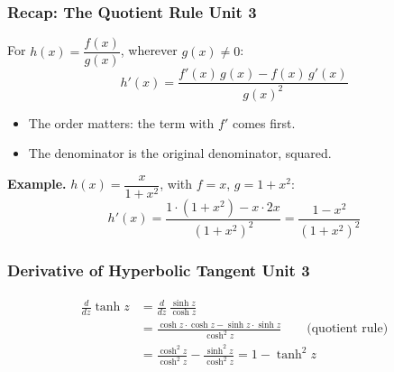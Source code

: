 \documentclass[12pt]{beamer}
\newcommand{\FrameTitle}[2]{\frametitle{#1 \hfill \small\textnormal{\textcolor{midgray}{#2}}}}
\begin{document}
\begin{frame}
    \medskip
    {}
\end{frame}

\begin{frame}\FrameTitle{Recap: The Quotient Rule}{Unit 3}
    For $h(x) = \dfrac{f(x)}{g(x)}$, wherever $g(x) \neq 0$:
    \[
        h'(x) = \frac{f'(x)\,g(x) - f(x)\,g'(x)}{g(x)^2}
    \]
    \begin{itemize}
        \item The order matters: the term with $f'$ comes first.
        \item The denominator is the original denominator, squared.
    \end{itemize}

    \medskip
    \textbf{Example.} $h(x) = \dfrac{x}{1+x^2}$, with $f = x$, $g = 1 + x^2$:
    \[
        h'(x) = \frac{1\cdot(1+x^2) - x\cdot 2x}{(1+x^2)^2}
              = \frac{1 - x^2}{(1+x^2)^2}
    \]
\end{frame}

\begin{frame}\FrameTitle{Derivative of Hyperbolic Tangent}{Unit 3}
    \begin{align*}
        \frac{d}{dz}\tanh z &= \frac{d}{dz}\,\frac{\sinh z}{\cosh z}\\[3mm]
            &= \frac{\cosh z \cdot \cosh z - \sinh z \cdot \sinh z}{\cosh^2 z}
            \qquad \text{(quotient rule)} \\[3mm]
            &= \frac{\cosh^2 z}{\cosh^2 z} - \frac{\sinh^2 z}{\cosh^2 z} = 1 - \tanh^2 z
\end{align*}
\end{frame}
\end{document}
